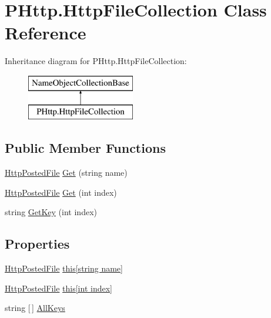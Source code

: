 \hypertarget{class_p_http_1_1_http_file_collection}{}\section{P\+Http.\+Http\+File\+Collection Class Reference}
\label{class_p_http_1_1_http_file_collection}
Inheritance diagram for P\+Http.\+Http\+File\+Collection\+:\begin{figure}[H]
\begin{center}
\leavevmode
\includegraphics[height=2.000000cm]{class_p_http_1_1_http_file_collection}
\end{center}
\end{figure}
\subsection*{Public Member Functions}
\begin{DoxyCompactItemize}
\item 
\hyperlink{class_p_http_1_1_http_posted_file}{Http\+Posted\+File} \hyperlink{class_p_http_1_1_http_file_collection_a51e9bd9c548f307fc58a13d21c22d6ea}{Get} (string name)
\item 
\hyperlink{class_p_http_1_1_http_posted_file}{Http\+Posted\+File} \hyperlink{class_p_http_1_1_http_file_collection_ad7091eaa0b20945d7ce3748c3b4a4436}{Get} (int index)
\item 
string \hyperlink{class_p_http_1_1_http_file_collection_a04fa2217947fc5be9dda258d243e58bf}{Get\+Key} (int index)
\end{DoxyCompactItemize}
\subsection*{Properties}
\begin{DoxyCompactItemize}
\item 
\hyperlink{class_p_http_1_1_http_posted_file}{Http\+Posted\+File} \hyperlink{class_p_http_1_1_http_file_collection_a1a9cd2818bd2ff42842d291245f53ceb}{this\mbox{[}string name\mbox{]}}
\item 
\hyperlink{class_p_http_1_1_http_posted_file}{Http\+Posted\+File} \hyperlink{class_p_http_1_1_http_file_collection_a226cad1ecd1fc8d8e619ce9016fce7a8}{this\mbox{[}int index\mbox{]}}
\item 
string \mbox{[}$\,$\mbox{]} \hyperlink{class_p_http_1_1_http_file_collection_ad272b2510b608e7c2789a6d36b4cbdbd}{All\+Keys}
\end{DoxyCompactItemize}


